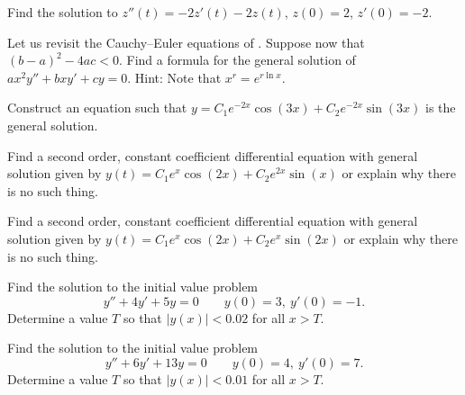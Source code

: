 \documentclass{ximera}
\begin{document}
\begin{exercise}%
    Find the solution to $z''(t) = -2z'(t)-2z(t)$, $z(0) = 2$, $z'(0)= -2$.
\end{exercise}


\begin{exercise}
    Let us revisit the Cauchy--Euler equations of .  Suppose now that ${(b-a)}^2-4ac < 0$.  Find a formula for the general solution of $a x^2 y'' + b x y' + c y = 0$.  Hint: Note that $x^r = e^{r \ln x}$.
\end{exercise}

\begin{exercise}
    Construct an equation such that $y = C_1 e^{-2x} \cos(3x) + C_2 e^{-2x} \sin(3x)$ is the general solution.
\end{exercise}

\begin{exercise}%
    Find a second order, constant coefficient differential equation with general solution given by $y(t) = C_1e^{x} \cos(2x) + C_2e^{2x}\sin(x)$ or explain why there is no such thing.
\end{exercise}

\begin{exercise}
    Find a second order, constant coefficient differential equation with general solution given by $y(t) = C_1e^{x} \cos(2x) + C_2e^{x}\sin(2x)$ or explain why there is no such thing.
\end{exercise}

\begin{exercise}
    Find the solution to the initial value problem 
    \[ 
        y'' + 4y' + 5y = 0 \qquad y(0) = 3,\ y'(0) = -1.
    \]
    Determine a value $T$ so that $|y(x)| < 0.02$ for all $x > T$. 
\end{exercise}

\begin{exercise}
    Find the solution to the initial value problem 
    \[ 
        y'' + 6y' + 13y = 0 \qquad y(0) = 4,\ y'(0) = 7.
    \]
    Determine a value $T$ so that $|y(x)| < 0.01$ for all $x > T$. 
\end{exercise}
%
\end{document}

